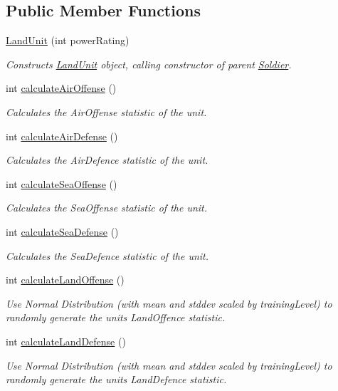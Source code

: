 \subsection*{Public Member Functions}
\begin{DoxyCompactItemize}
\item 
\mbox{\hyperlink{class_land_unit_ac7c62d6ea8573a8689afaddc04837279}{Land\+Unit}} (int power\+Rating)
\begin{DoxyCompactList}\small\item\em Constructs \mbox{\hyperlink{class_land_unit}{Land\+Unit}} object, calling constructor of parent \mbox{\hyperlink{class_soldier}{Soldier}}. \end{DoxyCompactList}\item 
int \mbox{\hyperlink{class_land_unit_af6b72446b89f0cceda3e71f0ccefd41e}{calculate\+Air\+Offense}} ()
\begin{DoxyCompactList}\small\item\em Calculates the Air\+Offense statistic of the unit. \end{DoxyCompactList}\item 
int \mbox{\hyperlink{class_land_unit_acf9d648efacea20a028b2d9dcaca0d64}{calculate\+Air\+Defense}} ()
\begin{DoxyCompactList}\small\item\em Calculates the Air\+Defence statistic of the unit. \end{DoxyCompactList}\item 
int \mbox{\hyperlink{class_land_unit_a40d93a3df8b92babc7a4f35a28dd3b73}{calculate\+Sea\+Offense}} ()
\begin{DoxyCompactList}\small\item\em Calculates the Sea\+Offense statistic of the unit. \end{DoxyCompactList}\item 
int \mbox{\hyperlink{class_land_unit_a5a0d88fe84b7700e9e85f6c3c1f1af9d}{calculate\+Sea\+Defense}} ()
\begin{DoxyCompactList}\small\item\em Calculates the Sea\+Defence statistic of the unit. \end{DoxyCompactList}\item 
int \mbox{\hyperlink{class_land_unit_a8f95f94a08fbdd268b85160dbd578947}{calculate\+Land\+Offense}} ()
\begin{DoxyCompactList}\small\item\em Use Normal Distribution (with mean and stddev scaled by training\+Level) to randomly generate the unit\textquotesingle{}s Land\+Offence statistic. \end{DoxyCompactList}\item 
int \mbox{\hyperlink{class_land_unit_acffd7525b2d214be433fe77ecf5610df}{calculate\+Land\+Defense}} ()
\begin{DoxyCompactList}\small\item\em Use Normal Distribution (with mean and stddev scaled by training\+Level) to randomly generate the unit\textquotesingle{}s Land\+Defence statistic. \end{DoxyCompactList}\end{DoxyCompactItemize}
